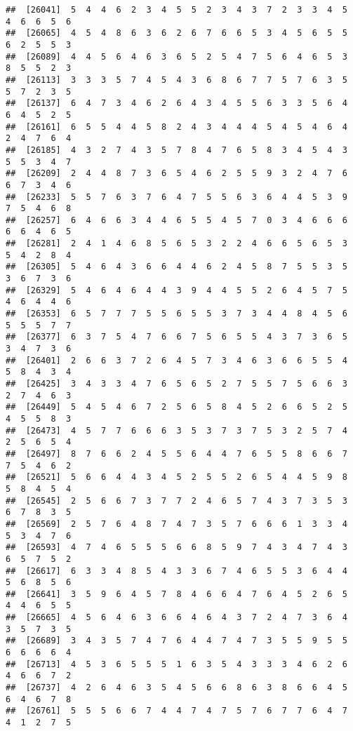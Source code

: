 \documentclass[
]{book}
\begin{document}
\begin{verbatim}
##  [26041]  5  4  4  6  2  3  4  5  5  2  3  4  3  7  2  3  3  4  5  4  6  6  5  6
##  [26065]  4  5  4  8  6  3  6  2  6  7  6  6  5  3  4  5  6  5  5  6  2  5  5  3
##  [26089]  4  4  5  6  4  6  3  6  5  2  5  4  7  5  6  4  6  5  3  8  5  5  2  3
##  [26113]  3  3  3  5  7  4  5  4  3  6  8  6  7  7  5  7  6  3  5  5  7  2  3  5
##  [26137]  6  4  7  3  4  6  2  6  4  3  4  5  5  6  3  3  5  6  4  6  4  5  2  5
##  [26161]  6  5  5  4  4  5  8  2  4  3  4  4  4  5  4  5  4  6  4  2  4  7  6  4
##  [26185]  4  3  2  7  4  3  5  7  8  4  7  6  5  8  3  4  5  4  3  5  5  3  4  7
##  [26209]  2  4  4  8  7  3  6  5  4  6  2  5  5  9  3  2  4  7  6  6  7  3  4  6
##  [26233]  5  5  7  6  3  7  6  4  7  5  5  6  3  6  4  4  5  3  9  7  5  4  6  8
##  [26257]  6  4  6  6  3  4  4  6  5  5  4  5  7  0  3  4  6  6  6  6  6  4  6  5
##  [26281]  2  4  1  4  6  8  5  6  5  3  2  2  4  6  6  5  6  5  3  5  4  2  8  4
##  [26305]  5  4  6  4  3  6  6  4  4  6  2  4  5  8  7  5  5  3  5  3  6  7  3  6
##  [26329]  5  4  6  4  6  4  4  3  9  4  4  5  5  2  6  4  5  7  5  4  6  4  4  6
##  [26353]  6  5  7  7  7  5  5  6  5  5  3  7  3  4  4  8  4  5  6  5  5  5  7  7
##  [26377]  6  3  7  5  4  7  6  6  7  5  6  5  5  4  3  7  3  6  5  3  4  7  3  6
##  [26401]  2  6  6  3  7  2  6  4  5  7  3  4  6  3  6  6  5  5  4  5  8  4  3  4
##  [26425]  3  4  3  3  4  7  6  5  6  5  2  7  5  5  7  5  6  6  3  2  7  4  6  3
##  [26449]  5  4  5  4  6  7  2  5  6  5  8  4  5  2  6  6  5  2  5  4  5  5  8  3
##  [26473]  4  5  7  7  6  6  6  3  5  3  7  3  7  5  3  2  5  7  4  2  5  6  5  4
##  [26497]  8  7  6  6  2  4  5  5  6  4  4  7  6  5  5  8  6  6  7  7  5  4  6  2
##  [26521]  5  6  6  4  4  3  4  5  2  5  5  2  6  5  4  4  5  9  8  5  8  4  5  4
##  [26545]  2  5  6  6  7  3  7  7  2  4  6  5  7  4  3  7  3  5  3  6  7  8  3  5
##  [26569]  2  5  7  6  4  8  7  4  7  3  5  7  6  6  6  1  3  3  4  5  3  4  7  6
##  [26593]  4  7  4  6  5  5  5  6  6  8  5  9  7  4  3  4  7  4  3  6  5  7  5  2
##  [26617]  6  3  3  4  8  5  4  3  3  6  7  4  6  5  5  3  6  4  4  5  6  8  5  6
##  [26641]  3  5  9  6  4  5  7  8  4  6  6  4  7  6  4  5  2  6  5  4  4  6  5  5
##  [26665]  4  5  6  4  6  3  6  6  4  6  4  3  7  2  4  7  3  6  4  3  5  7  3  5
##  [26689]  3  4  3  5  7  4  7  6  4  4  7  4  7  3  5  5  9  5  5  6  6  6  6  4
##  [26713]  4  5  3  6  5  5  5  1  6  3  5  4  3  3  3  4  6  2  6  4  6  6  7  2
##  [26737]  4  2  6  4  6  3  5  4  5  6  6  8  6  3  8  6  6  4  5  6  4  6  7  8
##  [26761]  5  5  5  6  6  7  4  4  7  4  7  5  7  6  7  7  6  4  7  4  1  2  7  5

\end{verbatim}
\end{document}
